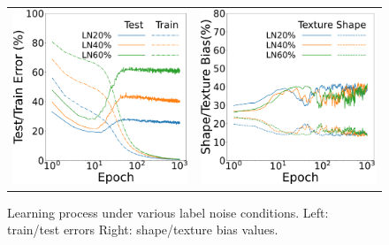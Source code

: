 \begin{figure}[htb]
\centering
   \begin{tabular}{cc}
      \hspace{-5mm}
      \includegraphics[keepaspectratio, width=0.45\linewidth]{fig/ln_learning_curv.pdf} &
       \hspace{5pt} 
      \includegraphics[keepaspectratio, width=0.45\linewidth]{fig/ln_sha_tex.pdf}
   \end{tabular}
\caption[Learning process under various label noise conditions.]{Learning process under various label noise conditions. Left: train/test errors Right: shape/texture bias values.}
\label{fig:comp_ln}
\end{figure}

